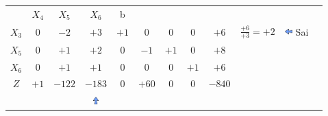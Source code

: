 \begin{frame}
{\begin{table}
\begin{tabular}{c c c c c c c c c c c c}
				&\cellcolor{blue!100} \color{white} $\scriptstyle X_4$ 
				&\cellcolor{blue!100} \color{red}   $\scriptstyle X_5$ 
				&\cellcolor{blue!100} \color{red}   $\scriptstyle X_6$ 
				&\cellcolor{blue!100} \color{white} \scriptsize b
				&
				&
				& \\
				\cellcolor{blue!100} \color{red} $\scriptstyle X_3$
				& \cellcolor{gray!50} $\scriptstyle 0$
				& \cellcolor{gray!50} $\scriptstyle -2$
				& \cellcolor{red!50} $\scriptstyle +3$
				& \cellcolor{gray!50} $\scriptstyle +1$
				& \cellcolor{gray!50} $\scriptstyle 0$
				& \cellcolor{gray!50} $\scriptstyle 0$
				& \cellcolor{gray!50} $\scriptstyle 0$
				& \cellcolor{gray!50} $\scriptstyle +6$
				& $\scriptstyle \frac{+6}{+3}=+2$ &
				\includegraphics[width=0.3cm,height=0.3cm]{setaesquerda.jpg} \scriptsize Sai \\
			    \cellcolor{blue!100} \color{red} $\scriptstyle X_5$
				& \cellcolor{yellow!50} $\scriptstyle 0$
				& \cellcolor{yellow!50} $\scriptstyle +1$
				& \cellcolor{gray!50} $\scriptstyle +2$
				& \cellcolor{yellow!50} $\scriptstyle 0$			
				& \cellcolor{yellow!50} $\scriptstyle -1$
				& \cellcolor{yellow!50} $\scriptstyle +1$
				& \cellcolor{yellow!50} $\scriptstyle 0$ 
				& \cellcolor{gray!50} $\scriptstyle +8$  \\
				\cellcolor{blue!100} \color{red} $\scriptstyle X_6$
				& \cellcolor{yellow!50} $\scriptstyle 0$
				& \cellcolor{yellow!50} $\scriptstyle +1$
				& \cellcolor{gray!50} $\scriptstyle +1$
				& \cellcolor{yellow!50} $\scriptstyle 0$
				& \cellcolor{yellow!50} $\scriptstyle 0$
				& \cellcolor{yellow!50} $\scriptstyle 0$
				& \cellcolor{yellow!50} $\scriptstyle +1$
				& \cellcolor{gray!50} $\scriptstyle +6$ \\
				\cellcolor{blue!100} \color{white} $\scriptstyle Z$
				& \cellcolor{yellow!50} $\scriptstyle +1$
				& \cellcolor{yellow!50} $\scriptstyle -122$
				& \cellcolor{gray!50} $\scriptstyle -183$
				& \cellcolor{yellow!50} $\scriptstyle 0$
				& \cellcolor{yellow!50} $\scriptstyle +60$
				& \cellcolor{yellow!50} $\scriptstyle 0$
				& \cellcolor{yellow!50} $\scriptstyle 0$ 
				& \cellcolor{gray!50} $\scriptstyle -840$  \\
				& & & \includegraphics[width=0.3cm,height=0.3cm]{setacima.jpg} \\

\end{tabular}
\end{table}}
\end{frame}
